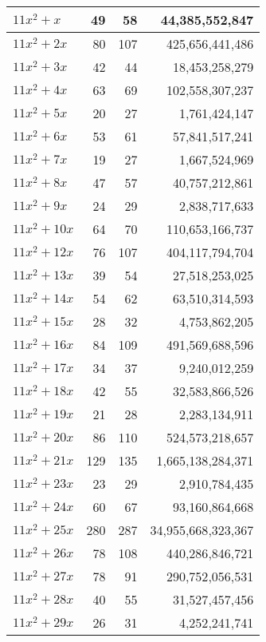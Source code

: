 \documentclass[a4paper]{amsproc}
\theoremstyle{plain}
\theoremstyle{named}
\begin{document}
\begin{longtable}{ | l | r | r | r | }
$11x^2 + x$ & 49 & 58 & 44{,}385{,}552{,}847 \\ \hline
$11x^2 + 2x$ & 80 & 107 & 425{,}656{,}441{,}486 \\ \hline
$11x^2 + 3x$ & 42 & 44 & 18{,}453{,}258{,}279 \\ \hline
$11x^2 + 4x$ & 63 & 69 & 102{,}558{,}307{,}237 \\ \hline
$11x^2 + 5x$ & 20 & 27 & 1{,}761{,}424{,}147 \\ \hline
$11x^2 + 6x$ & 53 & 61 & 57{,}841{,}517{,}241 \\ \hline
$11x^2 + 7x$ & 19 & 27 & 1{,}667{,}524{,}969 \\ \hline
$11x^2 + 8x$ & 47 & 57 & 40{,}757{,}212{,}861 \\ \hline
$11x^2 + 9x$ & 24 & 29 & 2{,}838{,}717{,}633 \\ \hline
$11x^2 + 10x$ & 64 & 70 & 110{,}653{,}166{,}737 \\ \hline
$11x^2 + 12x$ & 76 & 107 & 404{,}117{,}794{,}704 \\ \hline
$11x^2 + 13x$ & 39 & 54 & 27{,}518{,}253{,}025 \\ \hline
$11x^2 + 14x$ & 54 & 62 & 63{,}510{,}314{,}593 \\ \hline
$11x^2 + 15x$ & 28 & 32 & 4{,}753{,}862{,}205 \\ \hline
$11x^2 + 16x$ & 84 & 109 & 491{,}569{,}688{,}596 \\ \hline
$11x^2 + 17x$ & 34 & 37 & 9{,}240{,}012{,}259 \\ \hline
$11x^2 + 18x$ & 42 & 55 & 32{,}583{,}866{,}526 \\ \hline
$11x^2 + 19x$ & 21 & 28 & 2{,}283{,}134{,}911 \\ \hline
$11x^2 + 20x$ & 86 & 110 & 524{,}573{,}218{,}657 \\ \hline
$11x^2 + 21x$ & 129 & 135 & 1{,}665{,}138{,}284{,}371 \\ \hline
$11x^2 + 23x$ & 23 & 29 & 2{,}910{,}784{,}435 \\ \hline
$11x^2 + 24x$ & 60 & 67 & 93{,}160{,}864{,}668 \\ \hline
$11x^2 + 25x$ & 280 & 287 & 34{,}955{,}668{,}323{,}367 \\ \hline
$11x^2 + 26x$ & 78 & 108 & 440{,}286{,}846{,}721 \\ \hline
$11x^2 + 27x$ & 78 & 91 & 290{,}752{,}056{,}531 \\ \hline
$11x^2 + 28x$ & 40 & 55 & 31{,}527{,}457{,}456 \\ \hline
$11x^2 + 29x$ & 26 & 31 & 4{,}252{,}241{,}741 \\ \hline

\end{longtable}
\end{document}
